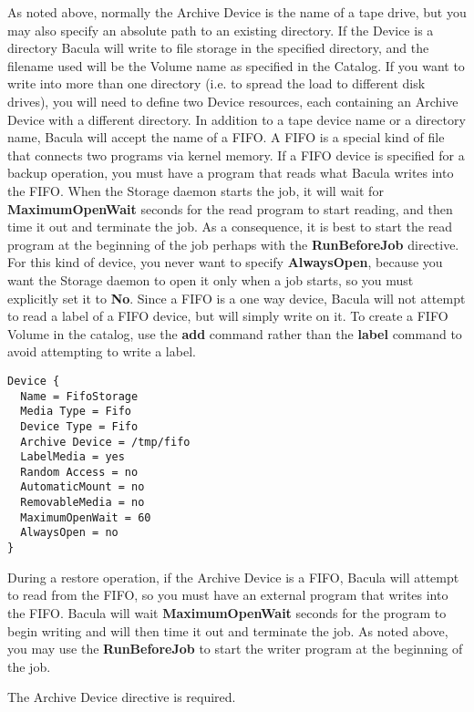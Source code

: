 \begin{description}
   As noted above, normally the Archive Device is the name of a tape drive, but
   you may also specify an absolute path to an existing directory. If the
   Device is a directory Bacula will write to file storage in the specified
   directory, and the filename used will be the Volume name as specified in the
   Catalog.  If you want to write into more than one directory (i.e.  to spread
   the load to different disk drives), you will need to define two Device
   resources, each containing an Archive Device with a different directory.
   \label{SetupFifo}
   In addition to a tape device name or a directory name, Bacula will  accept the
   name of a FIFO. A FIFO is a special kind of file that  connects two programs
   via kernel memory. If a FIFO device is specified  for a backup operation, you
   must have a program that reads what Bacula  writes into the FIFO. When the
   Storage daemon starts the job, it  will wait for {\bf MaximumOpenWait} seconds
   for the read program to start reading, and then time it out and  terminate
   the job. As a consequence, it is best to start the read  program at the
   beginning of the job perhaps with the {\bf RunBeforeJob}  directive. For this
   kind of device, you never want to specify  {\bf AlwaysOpen}, because you want
   the Storage daemon to open it only  when a job starts, so you must explicitly
   set it to {\bf No}.  Since a FIFO is a one way device, Bacula will not attempt
   to read  a label of a FIFO device, but will simply write on it. To create a 
   FIFO Volume in the catalog, use the {\bf add} command rather than the {\bf
   label} command to avoid attempting to write a label.

\footnotesize
\begin{verbatim}
Device {
  Name = FifoStorage
  Media Type = Fifo
  Device Type = Fifo
  Archive Device = /tmp/fifo
  LabelMedia = yes
  Random Access = no
  AutomaticMount = no
  RemovableMedia = no
  MaximumOpenWait = 60
  AlwaysOpen = no
}
\end{verbatim}
\normalsize

   During a restore operation, if the Archive Device is a FIFO, Bacula  will
   attempt to read from the FIFO, so you must have an external program  that
   writes into the FIFO. Bacula will wait {\bf MaximumOpenWait} seconds  for the
   program to begin writing and will then time it out and  terminate the job. As
   noted above, you may use the {\bf RunBeforeJob}  to start the writer program
   at the beginning of the job.  
   
   The Archive Device directive is required. 


\end{description}
